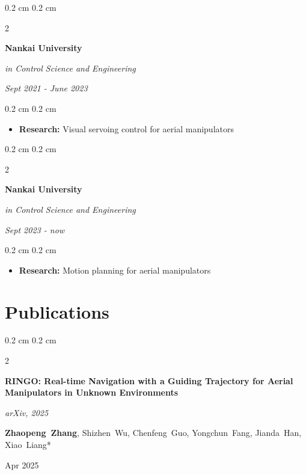 \documentclass[10pt, letterpaper]{article}
\newenvironment{highlights}{
  \begin{itemize}[
    topsep=0.10 cm,
    parsep=0.10 cm,
    partopsep=0pt,
    itemsep=0pt,
    leftmargin=0.4 cm + 10pt
  ]
}{
    \end{itemize}
} %
\newenvironment{onecolentry}{
    \begin{adjustwidth}{
        0.2 cm
    }{
        0.2 cm
    }
}{
    \end{adjustwidth}
} %
\newenvironment{twocolentry}[2][]{
    \onecolentry
    \def\secondColumn{#2}
    \setcolumnwidth{\fill, 4.0 cm}
    \begin{paracol}{2}
}{
    \switchcolumn \raggedleft \secondColumn
    \end{paracol}
    \endonecolentry
} %
\begin{document}
  \begin{twocolentry}{\textit{Sept 2021 - June 2023}}
    \textbf{Nankai University}

     \textit{in Control Science and Engineering}
  \end{twocolentry}
  
  \vspace{0.1cm}
  
  \begin{onecolentry}
    \begin{highlights}
      \item \textbf{Research:} Visual servoing control for aerial manipulators
    \end{highlights}
  \end{onecolentry}

  \vspace{0.1cm}

  \begin{twocolentry}{\textit{Sept 2023 - now}}
    \textbf{Nankai University}

     \textit{in Control Science and Engineering}
  \end{twocolentry}
  
  \vspace{0.1cm}
  
  \begin{onecolentry}
    \begin{highlights}
      \item \textbf{Research:} Motion planning for aerial manipulators
    \end{highlights}
  \end{onecolentry}

\section{Publications}
\begin{twocolentry}{Apr 2025}
  \textbf{RINGO: Real-time Navigation with a Guiding Trajectory for Aerial Manipulators in Unknown Environments}
  \vspace{0.10 cm}

  \textit{arXiv, 2025}
  \vspace{0.10 cm}

  \mbox{\textbf{Zhaopeng Zhang}}, \mbox{Shizhen Wu}, \mbox{Chenfeng Guo}, \mbox{Yongchun Fang}, \mbox{Jianda Han}, \mbox{Xiao Liang*}
\end{twocolentry}
\vspace{0.3 cm}
\end{document}
